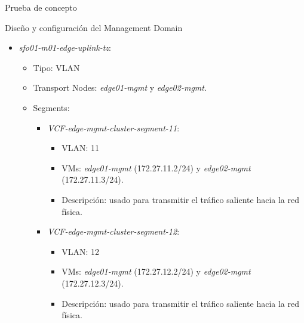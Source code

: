 \begin{section}{Prueba de concepto}
\begin{subsection}{Diseño y configuración del Management Domain}
\begin{itemize}
\begin{itemize}
\begin{itemize}
\begin{itemize}
                  \item Descripción: \textit{segment} usado por los componentes de VMware NSX-T para comunicarse entre los diferentes hosts ESXi.
                \end{itemize}
            \end{itemize}
        \end{itemize}
      \item \textit{sfo01-m01-edge-uplink-tz}:
        \begin{itemize}
          \item Tipo: VLAN
          \item Transport Nodes: \textit{edge01-mgmt} y \textit{edge02-mgmt}.
          \item Segments:
            \begin{itemize}
              
              \item \textit{VCF-edge-mgmt-cluster-segment-11}:
                \begin{itemize}
                  \item VLAN: 11
                  \item VMs: \textit{edge01-mgmt} (172.27.11.2/24) y \textit{edge02-mgmt} (172.27.11.3/24).
                  \item Descripción: usado para transmitir el tráfico saliente hacia la red física.
                \end{itemize}
              \item \textit{VCF-edge-mgmt-cluster-segment-12}:
                \begin{itemize}
                  \item VLAN: 12
                  \item VMs: \textit{edge01-mgmt} (172.27.12.2/24) y \textit{edge02-mgmt} (172.27.12.3/24).
                  \item Descripción: usado para transmitir el tráfico saliente hacia la red física.
                \end{itemize}
            \end{itemize}
          \end{itemize}
    \end{itemize}
    

\end{subsection}
\end{section}
